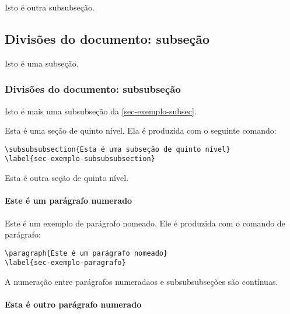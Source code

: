 Isto é outra subsubseção.

\subsection{Divisões do documento: subseção}\label{sec-exemplo-subsec}

Isto é uma subseção.

\subsubsection{Divisões do documento: subsubseção}

Isto é mais uma subsubseção da \autoref{sec-exemplo-subsec}.


\label{sec-exemplo-subsubsubsection}

Esta é uma seção de quinto nível. Ela é produzida com o seguinte comando:

\begin{verbatim}
\subsubsubsection{Esta é uma subseção de quinto nível}
\label{sec-exemplo-subsubsubsection}
\end{verbatim}

\label{sec-exemplo-subsubsubsection-outro}

Esta é outra seção de quinto nível.


\paragraph{Este é um parágrafo numerado}\label{sec-exemplo-paragrafo}

Este é um exemplo de parágrafo nomeado. Ele é produzida com o comando de
parágrafo:

\begin{verbatim}
\paragraph{Este é um parágrafo nomeado}
\label{sec-exemplo-paragrafo}
\end{verbatim}

A numeração entre parágrafos numeradaos e subsubsubseções são contínuas.

\paragraph{Esta é outro parágrafo numerado}\label{sec-exemplo-paragrafo-outro}

